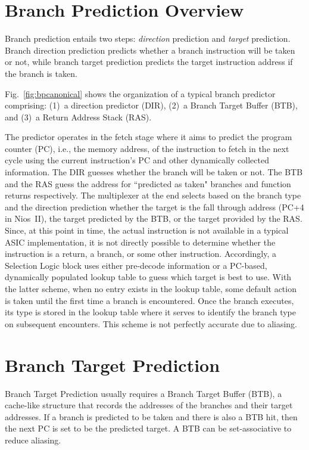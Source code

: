 \section{Branch Prediction Overview}
\label{sec:background:bpoverview}
Branch prediction entails two steps: \textit{direction} prediction and \textit{target} prediction. Branch direction prediction predicts whether a branch instruction will be taken or not, while branch target prediction predicts the target instruction address if the branch is taken.

Fig.~\ref{fig:bpcanonical} shows the organization of a typical branch predictor comprising: (1)~a direction predictor (DIR), (2)~a Branch Target Buffer (BTB), and (3)~a Return Address Stack (RAS).  

The predictor operates in the fetch stage where it aims to predict the program counter (PC), i.e., the memory address, of the instruction to fetch in the next cycle using the current instruction's PC and other dynamically collected information. The DIR guesses whether the branch will be taken or not. The BTB and the RAS guess the address for ``predicted as taken" branches and function returns respectively. The multiplexer at the end selects based on the branch type and the direction prediction whether the target is the fall through address (PC+4 in Nios~II), the target predicted by the BTB, or the target provided by the RAS. Since, at this point in time, the actual instruction is not available in a typical ASIC implementation, it is not directly possible to determine whether the instruction is a return, a branch, or some other instruction. Accordingly, a Selection Logic block uses either pre-decode information or a PC-based, dynamically populated lookup table to guess which target is best to use. With the latter scheme, when no entry exists in the lookup table, some default action is taken until the first time a branch is encountered. Once the branch executes, its type is stored in the lookup table where it serves to identify the branch type on subsequent encounters. This scheme is not perfectly accurate due to aliasing.

\section{Branch Target Prediction}
\label{sec:background:target}
Branch Target Prediction usually requires a Branch Target Buffer (BTB), a cache-like structure that records the addresses of the branches and their target addresses. If a branch is predicted to be taken and there is also a BTB hit, then the next PC is set to be the predicted target. A BTB can be set-associative to reduce aliasing.

